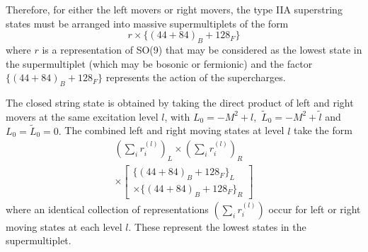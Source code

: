 Therefore, for either the left movers or right movers, the type IIA
superstring states must be arranged into massive supermultiplets of the form
\begin{equation}
r\times \{\left( 44+84\right) _B+128_F\}
\end{equation}
where $r$ is a representation of SO(9) that may be considered as the lowest
state in the supermultiplet (which may be bosonic or fermionic) and the
factor $\{\left( 44+84\right) _B+128_F\}$ represents the action of the
supercharges.

The closed string state is obtained by taking the direct product of left and
right movers at the same excitation level $l$, with $L_0=-M^2+l,\,\,\tilde L%
_0=-M^2+\tilde l$ and $L_0=\tilde L_0=0.$ The combined left and right moving
states at level $l$ take the form
\begin{equation}
\begin{array}{c}
\left( \sum_ir_i^{(l)}\right) _L\times \left( \sum_ir_i^{(l)}\right) _R \\
\times \left[
\begin{array}{l}
\{\left( 44+84\right) _B+128_F\}_L \\
\times \{\left( 44+84\right) _B+128_F\}_R
\end{array}
\right]
\end{array}
\label{perturb}
\end{equation}
where an identical collection of representations $\left(
\sum_ir_i^{(l)}\right) $ occur for left or right moving states at each level
$l$. These represent the lowest states in the supermultiplet.

